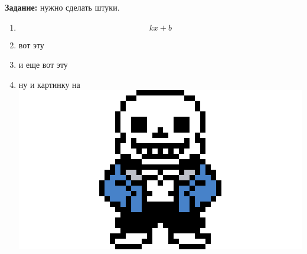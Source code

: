\textbf{Задание:} нужно сделать штуки.

\begin{enumerate}
\def\labelenumi{\arabic{enumi}.}
\tightlist
\item
  \[ kx+b \]
\item
  вот эту
\item
  и еще вот эту
\item
  ну и картинку на \includegraphics{task_pic.png}
\end{enumerate}
